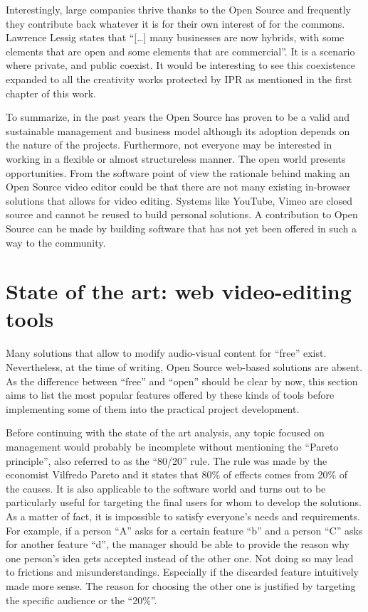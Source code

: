 Interestingly, large companies thrive thanks to the Open Source and frequently they contribute back whatever it is for their own interest of for the commons. Lawrence Lessig states that “[…] many businesses are now hybrids, with some elements that are open and some elements that are commercial”. It is a scenario where private, and public coexist. It would be interesting to see this coexistence expanded to all the creativity works protected by IPR as mentioned in the first chapter of this work.

To summarize, in the past years the Open Source has proven to be a valid and sustainable management and business model although its adoption depends on the nature of the projects. Furthermore, not everyone may be interested in working in a flexible or almost structureless manner.
The open world presents opportunities. From the software point of view the rationale behind making an Open Source video editor could be that there are not many existing in-browser solutions that allows for video editing. Systems like YouTube, Vimeo are closed source and cannot be reused to build personal solutions. A contribution to Open Source can be made by building software that has not yet been offered in such a way to the community.

\section{State of the art: web video-editing tools}
\label{sec:stateOfArt}

Many solutions that allow to modify audio-visual content for “free” exist. Nevertheless, at the time of writing, Open Source web-based solutions are absent. As the difference between “free” and “open” should be clear by now, this section aims to list the most popular features offered by these kinds of tools before implementing some of them into the practical project development.

Before continuing with the state of the art analysis, any topic focused on management would probably be incomplete without mentioning the “Pareto principle”, also referred to as the “80/20” rule. The rule was made by the economist Vilfredo Pareto and it states that 80\% of effects comes from 20\% of the causes. It is also applicable to the software world and turns out to be particularly useful for targeting the final users for whom to develop the solutions. As a matter of fact, it is impossible to satisfy everyone’s needs and requirements. For example, if a person “A” asks for a certain feature “b” and a person “C” asks for another feature “d”, the manager should be able to provide the reason why one person’s idea gets accepted instead of the other one. Not doing so may lead to frictions and misunderstandings. Especially if the discarded feature intuitively made more sense. The reason for choosing the other one is justified by targeting the specific audience or the “20\%”.

